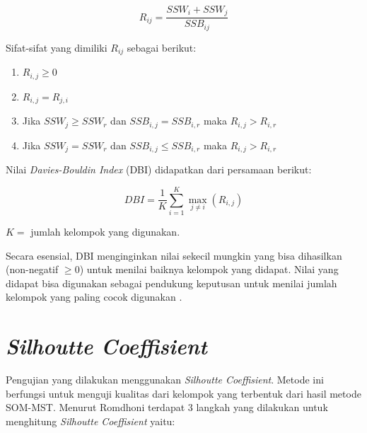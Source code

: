 \[
R_{ij} = \frac{{SSW}_i + {SSW}_j}{{SSB}_{ij}}
\]

Sifat-sifat yang dimiliki $R_{ij}$ sebagai berikut:

\begin{enumerate}
	\item $R_{i,j} \ge 0$
	\item $R_{i,j} = R_{j,i}$
	\item Jika $SSW_j \ge SSW_r$ dan $SSB_{i,j} = SSB_{i,r}$ maka $R_{i,j} > R_{i,r}$
	\item Jika $SSW_j = SSW_r$ dan $SSB_{i,j} \le SSB_{i,r}$ maka $R_{i,j} > R_{i,r}$
\end{enumerate}

Nilai \textit{Davies-Bouldin Index} (DBI) didapatkan dari persamaan berikut: 

\[
DBI = \frac{1}{K} \sum_{i=1}^{K} \max_{j \ne i} (R_{i,j})
\]

$K =$ jumlah kelompok yang digunakan.

Secara esensial, DBI menginginkan nilai sekecil mungkin yang bisa dihasilkan (non-negatif $\geq 0$) untuk menilai baiknya kelompok yang didapat. Nilai yang didapat bisa digunakan sebagai pendukung keputusan untuk menilai jumlah kelompok yang paling cocok digunakan \citep{Dan2015}.

\section{\textit{Silhoutte Coeffisient}}

Pengujian yang dilakukan menggunakan \textit{Silhoutte Coeffisient}. Metode ini berfungsi untuk menguji kualitas dari kelompok yang terbentuk dari hasil metode SOM-MST.
Menurut Romdhoni \citep{Kmeans2018} terdapat 3 langkah yang dilakukan untuk menghitung \textit{Silhoutte Coeffisient} yaitu:

